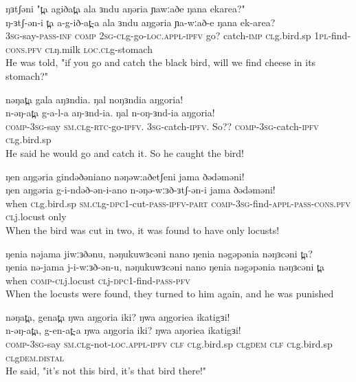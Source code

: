 \ex  ŋɜtʃəni "t̪a agiðat̪a ala ɜndu aŋəria ɲawːaðe ŋana ekarea?" 	  \\ 
	\gll  ŋ-ɜtʃ-ən-i t̪a a-g-ið-at̪-a ala ɜndu aŋgəria ɲa-wːað-e ŋana ek-area? \\	
		  \textsc{3sg}-say-\textsc{pass-inf} \textsc{comp} \textsc{2sg-cl}g-go-\textsc{loc.appl-ipfv} go? catch-\textsc{imp} \textsc{cl}g.bird.sp \textsc{1pl}-find-\textsc{cons.pfv} \textsc{cl}ŋ.milk \textsc{loc.cl}g-stomach    \\
		 \glt He was told, "if you go and catch the black bird, will we find cheese in its stomach?"
		 	  
\ex  nəŋat̪a gala aŋɜndia. ŋal noŋɜndia aŋgoria! 	  \\ 
	\gll  n-əŋ-at̪a g-a-l-a aŋ-ɜnd-ia. ŋal n-oŋ-ɜnd-ia aŋgoria!\\	
		  \textsc{comp-3sg}-say \textsc{sm.cl}g-\textsc{rtc}-go-\textsc{ipfv}. \textsc{3sg}-catch-\textsc{ipfv}. So?? \textsc{comp-3sg}-catch-\textsc{ipfv} \textsc{cl}g.bird.sp   \\
		 \glt He said he would go and catch it. So he caught the bird! 
		 	  
\ex  ŋen aŋgəria gindəðəniano nəŋəw:aðetʃeni jama ðədəməni!	  \\ 
	\gll  ŋen aŋgəria g-i-ndəð-ən-i-ano n-əŋə-wːɜð-ɜtʃ-ən-i jama ðədəməni!\\	
		  when \textsc{cl}g.bird.sp \textsc{sm.cl}g-\textsc{dpc1}-cut-\textsc{pass-ipfv-part} \textsc{comp-3sg}-find-\textsc{appl-pass-cons.pfv} \textsc{cl}j.locust only  \\
		 \glt When the bird was cut in two, it was found to have only locusts! 
		  	  
\ex  ŋenia nəjama jiwːɜðənu, nəŋukuwɜcəni nano ŋenia nəgəpənia nəŋɜcəni t̪a?	  \\ 
	\gll  ŋenia nə-jama j-i-wːɜð-ən-u, nəŋukuwɜcəni nano ŋenia nəgəpənia nəŋɜcəni t̪a\\	
		  when \textsc{comp-cl}j.locust \textsc{cl}j-\textsc{dpc1}-find-\textsc{pass-pfv}  \\
		 \glt When the locusts were found, they turned to him again, and he was punished  
		  	  
\ex  nəŋat̪a, genat̪a ŋwa aŋgoria iki? ŋwa aŋgoriea ikatigɜi!	  \\ 
	\gll  n-əŋ-at̪a, g-en-at̪-a ŋwa aŋgoria iki? ŋwa aŋoriea ikatigɜi!\\	
		  \textsc{comp-3sg}-say \textsc{sm.cl}g-not-\textsc{loc.appl-ipfv} \textsc{clf} \textsc{cl}g.bird.sp \textsc{cl}g\textsc{dem}  \textsc{clf} \textsc{cl}g.bird.sp \textsc{cl}g\textsc{dem.distal} \\
		 \glt He said, "it's not this bird, it's that bird there!" 
		  	  
